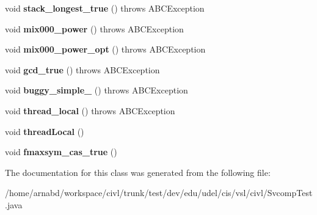 \begin{DoxyCompactItemize}
\item 
\hypertarget{classedu_1_1udel_1_1cis_1_1vsl_1_1civl_1_1SvcompTest_aa57d7960e12d0ae79f10609b920d5a24}{}void {\bfseries stack\+\_\+longest\+\_\+true} ()  throws A\+B\+C\+Exception \label{classedu_1_1udel_1_1cis_1_1vsl_1_1civl_1_1SvcompTest_aa57d7960e12d0ae79f10609b920d5a24}

\item 
\hypertarget{classedu_1_1udel_1_1cis_1_1vsl_1_1civl_1_1SvcompTest_acde4e688b3d6635136a0d0995548e793}{}void {\bfseries mix000\+\_\+power} ()  throws A\+B\+C\+Exception \label{classedu_1_1udel_1_1cis_1_1vsl_1_1civl_1_1SvcompTest_acde4e688b3d6635136a0d0995548e793}

\item 
\hypertarget{classedu_1_1udel_1_1cis_1_1vsl_1_1civl_1_1SvcompTest_a8ea461eef58227b2e90e8f7221f546ba}{}void {\bfseries mix000\+\_\+power\+\_\+opt} ()  throws A\+B\+C\+Exception \label{classedu_1_1udel_1_1cis_1_1vsl_1_1civl_1_1SvcompTest_a8ea461eef58227b2e90e8f7221f546ba}

\item 
\hypertarget{classedu_1_1udel_1_1cis_1_1vsl_1_1civl_1_1SvcompTest_a1e3e519ba98c118290ebfb3c5302b169}{}void {\bfseries gcd\+\_\+true} ()  throws A\+B\+C\+Exception \label{classedu_1_1udel_1_1cis_1_1vsl_1_1civl_1_1SvcompTest_a1e3e519ba98c118290ebfb3c5302b169}

\item 
\hypertarget{classedu_1_1udel_1_1cis_1_1vsl_1_1civl_1_1SvcompTest_ac1f56350d677ac05596cb29618666234}{}void {\bfseries buggy\+\_\+simple\+\_} ()  throws A\+B\+C\+Exception \label{classedu_1_1udel_1_1cis_1_1vsl_1_1civl_1_1SvcompTest_ac1f56350d677ac05596cb29618666234}

\item 
\hypertarget{classedu_1_1udel_1_1cis_1_1vsl_1_1civl_1_1SvcompTest_a4933fed03519a30c42eb0c8666c95288}{}void {\bfseries thread\+\_\+local} ()  throws A\+B\+C\+Exception \label{classedu_1_1udel_1_1cis_1_1vsl_1_1civl_1_1SvcompTest_a4933fed03519a30c42eb0c8666c95288}

\item 
\hypertarget{classedu_1_1udel_1_1cis_1_1vsl_1_1civl_1_1SvcompTest_a901d8d7f600b49c8c77848cac57ddfe3}{}void {\bfseries thread\+Local} ()\label{classedu_1_1udel_1_1cis_1_1vsl_1_1civl_1_1SvcompTest_a901d8d7f600b49c8c77848cac57ddfe3}

\item 
\hypertarget{classedu_1_1udel_1_1cis_1_1vsl_1_1civl_1_1SvcompTest_aea05332bde3faabf2f59730f4695fd6a}{}void {\bfseries fmaxsym\+\_\+cas\+\_\+true} ()\label{classedu_1_1udel_1_1cis_1_1vsl_1_1civl_1_1SvcompTest_aea05332bde3faabf2f59730f4695fd6a}

\end{DoxyCompactItemize}


The documentation for this class was generated from the following file\+:\begin{DoxyCompactItemize}
\item 
/home/arnabd/workspace/civl/trunk/test/dev/edu/udel/cis/vsl/civl/Svcomp\+Test.\+java\end{DoxyCompactItemize}
